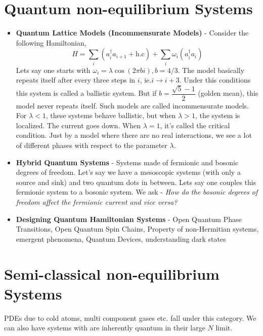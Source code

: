 \documentclass[a4paper,11pt]{article}
\begin{document}
\section{Quantum non-equilibrium Systems}
\begin{itemize}
	\item \textbf{Quantum Lattice Models (Incommensurate Models)} - Consider the following Hamiltonian,
	\begin{equation*}
	H = \sum_i (a_i^\dagger a_{i+1} + \text{h.c}) +  \sum_i \omega_i (a_i^\dagger a_{i})
	\end{equation*}
	Lets say one starts with $ \omega_i = \lambda \cos(2 \pi b i), b = 4/3 $. The model basically repeats itself after every three steps in $ i $, ie.$ i \rightarrow i + 3 $. Under this conditions this system is called a ballistic system. But if $ b = \dfrac{\sqrt{5} -1}{2} $ (golden mean), this model never repeats itself. Such models are called incommensurate models. For $ \lambda < 1 $, these systems behave ballistic, but when $ \lambda > 1 $, the system is localized. The current goes down. When $ \lambda = 1 $, it's called the critical condition. Just by a model where there are no real interactions, we see a lot of different phases with respect to the parameter $ \lambda $.
	\item \textbf{Hybrid Quantum Systems} - Systems made of fermionic and bosonic degrees of freedom. Let's say we have a mesoscopic systems (with only a source and sink) and two quantum dots in between. Lets say one couples this fermionic system to a bosonic system. We ask -\textit{ How do the bosonic degrees of freedom affect the fermionic current and vice versa?}
	\item \textbf{Designing Quantum Hamiltonian Systems} - Open Quantum Phase Transitions, Open Quantum Spin Chains, Property of non-Hermitian systems, emergent phenomena, Quantum Devices, understanding dark states
\end{itemize}

\section{Semi-classical non-equilibrium Systems}
PDEs due to cold atoms, multi component gases etc. fall under this category. We can also have systems with are inherently quantum in their large $ N $ limit.
\end{document}
